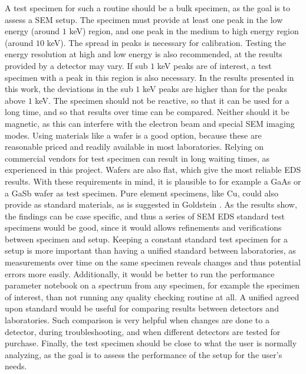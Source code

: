 A test specimen for such a routine should be a bulk specimen, as the goal is to assess a SEM setup.
The specimen must provide at least one peak in the low energy (around $1$ keV) region, and one peak in the medium to high energy region (around $10$ keV).
The spread in peaks is necessary for calibration.
Testing the energy resolution at high and low energy is also recommended, at the results provided by a detector may vary.
If sub $1$ keV peaks are of interest, a test specimen with a peak in this region is also necessary.
In the results presented in this work, the deviations in the sub $1$ keV peaks are higher than for the peaks above $1$ keV.
The specimen should not be reactive, so that it can be used for a long time, and so that results over time can be compared.
Neither should it be magnetic, as this can interfere with the electron beam and special SEM imaging modes.
Using materials like a wafer is a good option, because these are reasonable priced and readily available in most laboratories.
Relying on commercial vendors for test specimen can result in long waiting times, as experienced in this project.
Wafers are also flat, which give the most reliable EDS results.
With these requirements in mind, it is plausible to for example a GaAs or a GaSb wafer as test specimen.
Pure element specimens, like Cu, could also provide as standard materials, as is suggested in Goldstein \cite{goldstein_scanning_2018}.
As the results show, the findings can be case specific, and thus a series of SEM EDS standard test specimens would be good, since it would allows refinements and verifications between specimen and setup.
Keeping a constant standard test specimen for a setup is more important than having a unified standard between laboratories, as measurements over time on the same specimen reveals changes and thus potential errors more easily.
Additionally, it would be better to run the performance parameter notebook on a spectrum from any specimen, for example the specimen of interest, than not running any quality checking routine at all.
A unified agreed upon standard would be useful for comparing results between detectors and laboratories.
Such comparison is very helpful when changes are done to a detector, during troubleshooting, and when different detectors are tested for purchase.
Finally, the test specimen should be close to what the user is normally analyzing, as the goal is to assess the performance of the setup for the user's needs.



